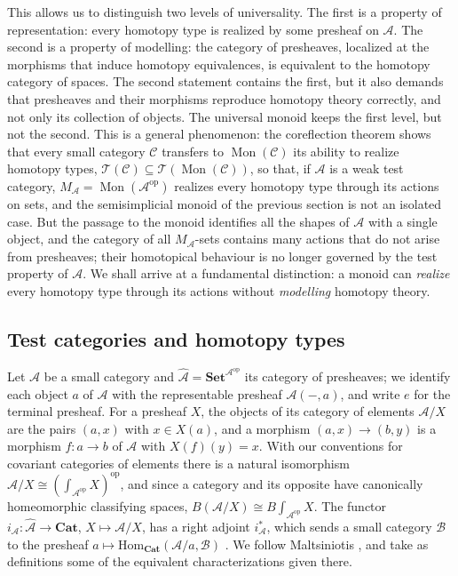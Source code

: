 \documentclass[11pt]{amsart}
\theoremstyle{definition}
\theoremstyle{remark}
\numberwithin{figure}{section}%
\newcommand{\CC}{\mathcal{C}}
\DeclareMathOperator{\Mon}{Mon}
\newcommand{\T}{\mathcal{T}}
\newcommand{\Set}{\mathbf{Set}}
\newcommand{\Cat}{\mathbf{Cat}}
\newcommand{\Hom}{\mathrm{Hom}}
\newcommand{\op}{\mathrm{op}}
\newcommand{\A}{\mathcal{A}}
\begin{document}
This allows us to distinguish two levels of universality. The first is a property of representation: every homotopy type is realized by some presheaf on $\A$. The second is a property of modelling: the category of presheaves, localized at the morphisms that induce homotopy equivalences, is equivalent to the homotopy category of spaces. The second statement contains the first, but it also demands that presheaves and their morphisms reproduce homotopy theory correctly, and not only its collection of objects. The universal monoid keeps the first level, but not the second. This is a general phenomenon: the coreflection theorem shows that every small category $\CC$ transfers to $\Mon(\CC)$ its ability to realize homotopy types, $\T(\CC)\subseteq\T(\Mon(\CC))$, so that, if $\A$ is a weak test category, $M_\A=\Mon(\A^{\op})$ realizes every homotopy type through its actions on sets, and the semisimplicial monoid of the previous section is not an isolated case. But the passage to the monoid identifies all the shapes of $\A$ with a single object, and the category of all $M_\A$-sets contains many actions that do not arise from presheaves; their homotopical behaviour is no longer governed by the test property of $\A$. We shall arrive at a fundamental distinction: a monoid can \emph{realize} every homotopy type through its actions without \emph{modelling} homotopy theory.

\subsection{Test categories and homotopy types}
\label{subsec:test-categories-homotopy-types}

Let $\A$ be a small category and $\widehat{\A}=\Set^{\A^{\op}}$ its category of presheaves; we identify each object $a$ of $\A$ with the representable presheaf $\A(-,a)$, and write $e$ for the terminal presheaf. For a presheaf $X$, the objects of its category of elements $\A/X$ are the pairs $(a,x)$ with $x\in X(a)$, and a morphism $(a,x)\to(b,y)$ is a morphism $f\colon a\to b$ of $\A$ with $X(f)(y)=x$. With our conventions for covariant categories of elements there is a natural isomorphism $\A/X\cong(\int_{\A^{\op}}X)^{\op}$, and since a category and its opposite have canonically homeomorphic classifying spaces, $B(\A/X)\cong B\!\int_{\A^{\op}}X$. The functor $i_\A\colon\widehat{\A}\to\Cat$, $X\mapsto\A/X$, has a right adjoint $i_\A^*$, which sends a small category $\mathcal B$ to the presheaf $a\mapsto\Hom_{\Cat}(\A/a,\mathcal B)$ \cite[1.2.1 and 1.2.2]{Malt}. We follow Maltsiniotis \cite{Malt}, and take as definitions some of the equivalent characterizations given there.
\end{document}
